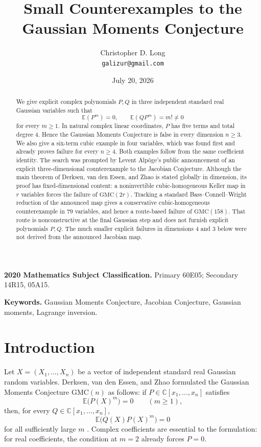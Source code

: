 \documentclass[11pt]{article}
\title{Small Counterexamples to the Gaussian Moments Conjecture}
\author{Christopher D. Long\\\texttt{galizur@gmail.com}}
\date{July 20, 2026}
\newcommand{\C}{\mathbb C}
\newcommand{\E}{\mathbb E}
\newcommand{\GMC}{\mathrm{GMC}}
\theoremstyle{remark}
\begin{document}
\maketitle

\begin{abstract}
We give explicit complex polynomials $P,Q$ in three independent standard real Gaussian variables such that
\[
  \E(P^m)=0,\qquad \E(QP^m)=m!\neq0
\]
for every $m\geq1$.  In natural complex linear coordinates, $P$ has five terms and total degree $4$.  Hence the Gaussian Moments Conjecture is false in every dimension $n\geq3$.  We also give a six-term cubic example in four variables, which was found first and already proves failure for every $n\geq4$.  Both examples follow from the same coefficient identity.  The search was prompted by Levent Alp\"oge's public announcement of an explicit three-dimensional counterexample to the Jacobian Conjecture.  Although the main theorem of Derksen, van den Essen, and Zhao is stated globally in dimension, its proof has fixed-dimensional content: a noninvertible cubic-homogeneous Keller map in $r$ variables forces the failure of $\GMC(2r)$.  Tracking a standard Bass--Connell--Wright reduction of the announced map gives a conservative cubic-homogeneous counterexample in $79$ variables, and hence a route-based failure of $\GMC(158)$.  That route is nonconstructive at the final Gaussian step and does not furnish explicit polynomials $P,Q$.  The much smaller explicit failures in dimensions $4$ and $3$ below were not derived from the announced Jacobian map.
\end{abstract}

\medskip
\noindent\textbf{2020 Mathematics Subject Classification.} Primary 60E05; Secondary 14R15, 05A15.

\noindent\textbf{Keywords.} Gaussian Moments Conjecture, Jacobian Conjecture, Gaussian moments, Lagrange inversion.

\section{Introduction}

Let $X=(X_1,\dots,X_n)$ be a vector of independent standard real Gaussian random variables.  Derksen, van den Essen, and Zhao formulated the Gaussian Moments Conjecture $\GMC(n)$ as follows: if $P\in\C[x_1,\dots,x_n]$ satisfies
\[
  \E\bigl(P(X)^m\bigr)=0\qquad(m\geq1),
\]
then, for every $Q\in\C[x_1,\dots,x_n]$,
\[
  \E\bigl(Q(X)P(X)^m\bigr)=0
\]
for all sufficiently large $m$ \cite[Conjecture~1.1]{DVEZ}.  Complex coefficients are essential to the formulation: for real coefficients, the condition at $m=2$ already forces $P=0$.
\end{document}
